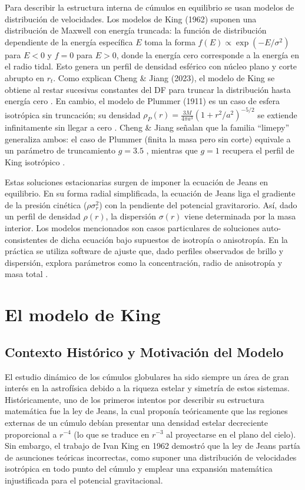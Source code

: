     Para describir la estructura interna de cúmulos en equilibrio se usan 
    modelos de distribución de velocidades. Los modelos de King (1962) suponen 
    una distribución de Maxwell con energía truncada: la función de distribución 
    dependiente de la energía específica $E$ toma la forma $f(E) \varpropto 
    \exp{(-E/\sigma^2)}$ para $E < 0$ y $f = 0$ para $E > 0$, donde la energía 
    cero corresponde a la energía en el radio tidal. Esto genera un perfil de 
    densidad esférico con núcleo plano y corte abrupto en $r_t$. Como explican 
    Cheng \& Jiang (2023), el modelo de King se obtiene al restar sucesivas 
    constantes del DF para truncar la distribución hasta energía cero 
    \cite{Cheng2023}. En cambio, el modelo de Plummer (1911) es un caso de 
    esfera isotrópica sin truncación; su densidad $\rho_P(r) = \frac{3M}{4\pi 
    a^3}\left(1 + r^2/a^2\right)^{-5/2}$ se extiende infinitamente sin llegar a 
    cero \cite{Cheng2023}. Cheng \& Jiang señalan que la familia “limepy” 
    generaliza ambos: el caso de Plummer (finita la masa pero sin corte) 
    equivale a un parámetro de truncamiento $g = 3.5$ \cite{Cheng2023}, mientras 
    que $g = 1$ recupera el perfil de King isotrópico \cite{Cheng2023}.

    Estas soluciones estacionarias surgen de imponer la ecuación de Jeans en 
    equilibrio. En su forma radial simplificada, la ecuación de Jeans liga el 
    gradiente de la presión cinética ($\rho\sigma_r^2$) con la pendiente del 
    potencial gravitarorio. Así, dado un perfil de densidad $\rho(r)$, la 
    dispersión $\sigma(r)$ viene determinada por la masa interior. Los modelos 
    mencionados son casos particulares de soluciones auto-consistentes de dicha 
    ecuación bajo supuestos de isotropía o anisotropía. En la práctica se 
    utiliza software de ajuste que, dado perfiles observados de brillo y 
    dispersión, explora parámetros como la concentración, radio de anisotropía y 
    masa total \cite{Cheng2023}.

\section{El modelo de King}
    \subsection{Contexto Histórico y Motivación del Modelo}
        El estudio dinámico de los cúmulos globulares ha sido siempre un área de 
        gran interés en la astrofísica debido a la riqueza estelar y simetría de 
        estos sistemas. Históricamente, uno de los primeros intentos por 
        describir su estructura matemática fue la ley de Jeans, la cual proponía 
        teóricamente que las regiones externas de un cúmulo debían presentar una 
        densidad estelar decreciente proporcional a $r^{-4}$ (lo que se traduce 
        en $r^{-3}$ al proyectarse en el plano del cielo). Sin embargo, el 
        trabajo de Ivan King en 1962 demostró que la ley de Jeans partía de 
        asunciones teóricas incorrectas, como suponer una distribución de 
        velocidades isotrópica en todo punto del cúmulo y emplear una expansión 
        matemática injustificada para el potencial gravitacional.

